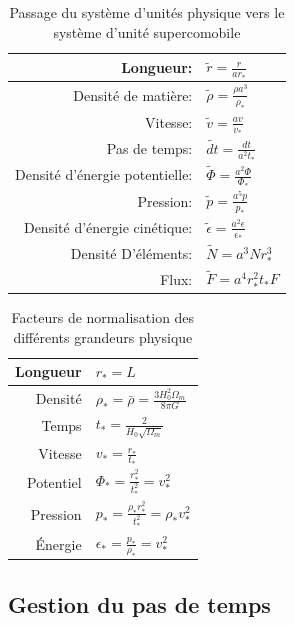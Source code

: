 \begin{table}[htbp]
\begin{center}
\begin{tabular}{r l} \hline 
Longueur: & $\tilde{r}=\frac{r}{ar_*}$ \\ \hline 
Densité de matière: & $\tilde{\rho}=\frac{\rho a^3}{\rho_*}$ \\ \hline 
Vitesse: & $ \tilde{v}=\frac{av}{v_*}$ \\ \hline 
Pas de temps: & $\tilde{dt}=\frac{dt}{a^2t_*}$\\ \hline 
Densité d’énergie potentielle: & $\tilde{\Phi}=\frac{a^2 \Phi}{\Phi_*}$\\ \hline 
Pression: & $\tilde{p}=\frac{a^5 p}{p_*}$\\ \hline 
Densité d’énergie cinétique: & $\tilde{\epsilon}=\frac{a^2 \epsilon}{\epsilon_*}$\\ \hline 
Densité D’éléments: & $\tilde{N}=a^3 N r_*^3$\\ \hline 
Flux: & $\tilde{F}=a^4 r_*^2 t_* F$\\ \hline 
\end{tabular} 
\end{center}
\caption{Passage du système d'unités physique vers le système d'unité supercomobile} 
\end{table}

\begin{table}[htbp]
\begin{center}
\begin{tabular}{r l} \hline 
Longueur  & $r_*=L$\\ \hline 
Densité & $\rho_* = \bar{\rho} = \frac{3H_0^2 \Omega_m}{8\pi G}$\\ \hline 
Temps & $t_* = \frac{2}{H_0 \sqrt{\Omega_m}}$\\ \hline 
Vitesse & $v_* = \frac{r_*}{t_*}$\\ \hline 
Potentiel & $\Phi_* = \frac{r_*^2}{t_*^2} = v_*^2$\\ \hline 
Pression & $p_* = \frac{\rho_* r_*^2}{t_*^2} = \rho_* v_*^2$\\ \hline 
Énergie & $\epsilon_* = \frac{p_*}{\rho_*} = v_*^2$\\ \hline 
\end{tabular} 
\end{center}

\caption{Facteurs de normalisation des différents grandeurs physique} 
\end{table}

\subsection{Gestion du pas de temps}


